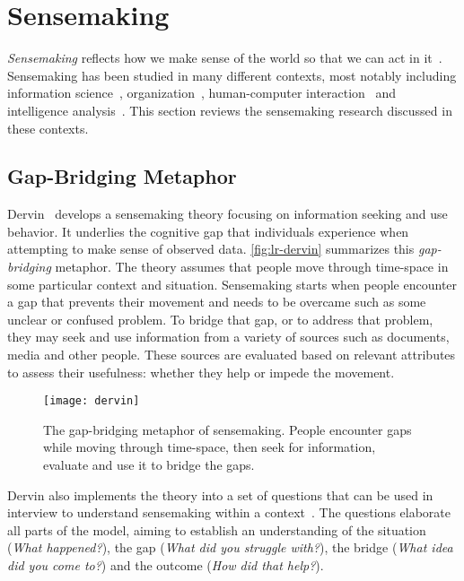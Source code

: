 \section{Sensemaking}
\label{sub:lr-sensemaking}
\emph{Sensemaking} reflects how we make sense of the world so that we can act in it~\cite{Snowden2005}. Sensemaking has been studied in many different contexts, most notably including information science~\cite{Dervin1983}, organization~\cite{Weick1995}, human-computer interaction~\cite{Russell1993} and intelligence analysis~\cite{Pirolli2005,Klein2003}. This section reviews the sensemaking research discussed in these contexts.

\subsection{Gap-Bridging Metaphor}
Dervin~\cite{Dervin1983} develops a sensemaking theory focusing on information seeking and use behavior. It underlies the cognitive gap that individuals experience when attempting to make sense of observed data. \autoref{fig:lr-dervin} summarizes this \emph{gap-bridging} metaphor. The theory assumes that people move through time-space in some particular context and situation. Sensemaking starts when people encounter a gap that prevents their movement and needs to be overcame such as some unclear or confused problem. To bridge that gap, or to address that problem, they may seek and use information from a variety of sources such as documents, media and other people. These sources are evaluated based on relevant attributes to assess their usefulness: whether they help or impede the movement.

\begin{figure}[!htb]
	\centering
	\texttt{[image: dervin]}
	\caption[The gap-bridging metaphor of sensemaking]{The gap-bridging metaphor of sensemaking. People encounter gaps while moving through time-space, then seek for information, evaluate and use it to bridge the gaps. }
	\label{fig:lr-dervin}
\end{figure}

Dervin also implements the theory into a set of questions that can be used in interview to understand sensemaking within a context~\cite{Dervin1983}. The questions elaborate all parts of the model, aiming to establish an understanding of the situation (\emph{What happened?}), the gap (\emph{What did you struggle with?}), the bridge (\emph{What idea did you come to?}) and the outcome (\emph{How did that help?}).

